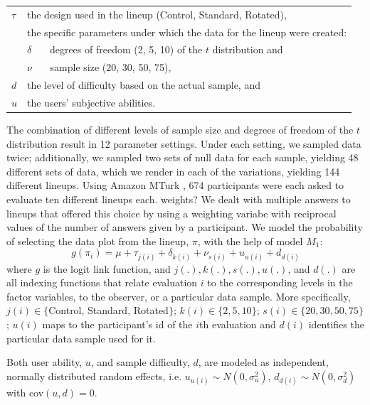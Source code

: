 \documentclass{article}\usepackage[]{graphicx}\usepackage[]{color}
\newcommand{\hh}[1]{{\color{orange} #1}}
\begin{document}
\begin{center}
\begin{tabular}{lp{5in}}
$\tau$ & the design used in the lineup (Control, Standard, Rotated), \\
&  the specific parameters under which the data for the lineup were created: \\
&  $\delta$ \ \ \ degrees of freedom (2, 5, 10) {of the $t$ distribution} and \\
&  $\nu$  \ \ \ sample size (20, 30, 50, 75), \\
$d$ &  the level of difficulty based on the actual sample, and \\
$u$ & the users' subjective abilities.
 \end{tabular}
\end{center}
%
The combination of different levels of sample size and degrees of freedom of the $t$ distribution result in 12 parameter settings. Under each setting, we sampled data twice; additionally, we sampled two sets of null data for each sample, yielding 48 different sets of data, which we render in each of the variations, yielding 144 different lineups. 
Using  Amazon MTurk \citep{amazon}, 674 participants were each asked to evaluate ten different lineups each. 
\hh{weights? We dealt with multiple answers to lineups that offered this choice by using a weighting variabe with reciprocal values of the number of answers given by a participant.}
We model the probability of selecting the data plot from the lineup, $\pi$, with the help of model $M_1$:
\[
g(\pi_i) = \mu + \tau_{j(i)} +\delta_{k(i)}+ \nu_{s(i)} + u_{u(i)} + d_{d(i)}
\]
where $g$ is the logit link function, and $j(.), k(.), s(.), u(.)$, and $d(.)$ are all indexing functions that relate evaluation $i$ to the corresponding levels in the factor variables, to the observer, or a particular data sample. More specifically, $j(i) \in \{$Control, Standard, Rotated$\}$; $k(i) \in \{2,5,10\}$; $s(i) \in \{20, 30, 50, 75\}$; $u(i)$ maps to the participant's id of the $i$th evaluation and $d(i)$ identifies the particular data sample used for it. 

Both user ability, $u$, and sample difficulty, $d$, are modeled as independent, normally distributed  random effects, i.e. $u_{u(i)} \sim N(0, \sigma_u^2)$, $d_{d(i)} \sim N(0,\sigma_d^2)$ with cov$(u, d) = 0$.
\end{document}
